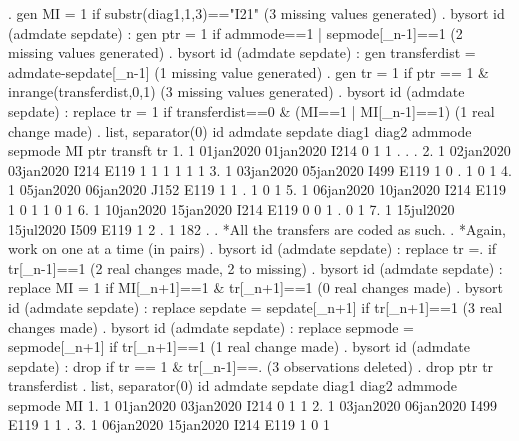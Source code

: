 . gen MI = 1 if substr(diag1,1,3)=="I21"
(3 missing values generated)
{\smallskip}
. bysort id (admdate sepdate) : gen ptr = 1 if admmode==1 | sepmode[_n-1]==1
(2 missing values generated)
{\smallskip}
. bysort id (admdate sepdate) : gen transferdist = admdate-sepdate[_n-1]
(1 missing value generated)
{\smallskip}
. gen tr = 1 if ptr == 1 \& inrange(transferdist,0,1)
(3 missing values generated)
{\smallskip}
. bysort id (admdate sepdate) : replace tr = 1 if transferdist==0 \& (MI==1 | MI[_n-1]==1)
(1 real change made)
{\smallskip}
. list, separator(0)
{\smallskip}
     {\TLC}
     {\VBAR} id     admdate     sepdate   diag1   diag2   admmode   sepmode   MI   ptr   transf{\tytilde}t   tr {\VBAR}
     {\LFTT}
  1. {\VBAR}  1   01jan2020   01jan2020    I214                 0         1    1     .          .    . {\VBAR}
  2. {\VBAR}  1   02jan2020   03jan2020    I214    E119         1         1    1     1          1    1 {\VBAR}
  3. {\VBAR}  1   03jan2020   05jan2020    I499    E119         1         0    .     1          0    1 {\VBAR}
  4. {\VBAR}  1   05jan2020   06jan2020    J152    E119         1         1    .     1          0    1 {\VBAR}
  5. {\VBAR}  1   06jan2020   10jan2020    I214    E119         1         0    1     1          0    1 {\VBAR}
  6. {\VBAR}  1   10jan2020   15jan2020    I214    E119         0         0    1     .          0    1 {\VBAR}
  7. {\VBAR}  1   15jul2020   15jul2020    I509    E119         1         2    .     1        182    . {\VBAR}
     {\BLC}
{\smallskip}
. *All the transfers are coded as such. 
. *Again, work on one at a time (in pairs)
. bysort id (admdate sepdate) : replace tr =. if tr[_n-1]==1
(2 real changes made, 2 to missing)
{\smallskip}
. bysort id (admdate sepdate) : replace MI = 1 if MI[_n+1]==1 \& tr[_n+1]==1
(0 real changes made)
{\smallskip}
. bysort id (admdate sepdate) : replace sepdate = sepdate[_n+1] if tr[_n+1]==1
(3 real changes made)
{\smallskip}
. bysort id (admdate sepdate) : replace sepmode = sepmode[_n+1] if tr[_n+1]==1
(1 real change made)
{\smallskip}
. bysort id (admdate sepdate) : drop if tr == 1 \& tr[_n-1]==.
(3 observations deleted)
{\smallskip}
. drop ptr tr transferdist
{\smallskip}
. list, separator(0)
{\smallskip}
     {\TLC}
     {\VBAR} id     admdate     sepdate   diag1   diag2   admmode   sepmode   MI {\VBAR}
     {\LFTT}
  1. {\VBAR}  1   01jan2020   03jan2020    I214                 0         1    1 {\VBAR}
  2. {\VBAR}  1   03jan2020   06jan2020    I499    E119         1         1    . {\VBAR}
  3. {\VBAR}  1   06jan2020   15jan2020    I214    E119         1         0    1 {\VBAR}
